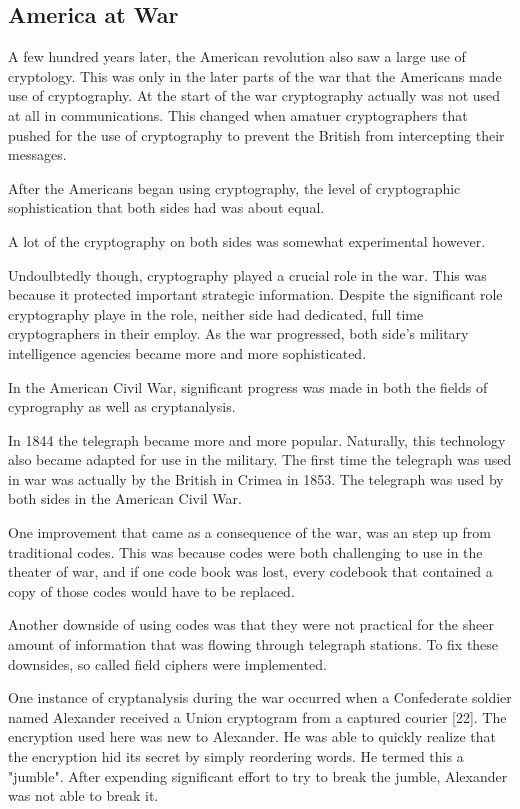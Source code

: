 \documentclass{article}
\begin{document}
    \subsection{America at War} 

    A few hundred years later, the American revolution also saw a large
    use of cryptology. This was only in the later parts of the war
    that the Americans made use of cryptography.
    At the start of the war cryptography actually was not used at all
    in communications. This changed when amatuer cryptographers
    that pushed for the use of cryptography to prevent the British
    from intercepting their messages.

    After the Americans began using cryptography, the level of
    cryptographic sophistication that both sides had was about equal.

    A lot of the cryptography on both sides was somewhat experimental however.

    Undoulbtedly though, cryptography played a crucial role in the war.
    This was because it protected important strategic information.
    Despite the significant role cryptography playe in the role,
    neither side had dedicated, full time cryptographers in their employ.
    As the war progressed, both side's military intelligence agencies
    became more and more sophisticated.

    In the American Civil War, significant progress was made in
    both the fields of cyprography as well as cryptanalysis.

    In 1844 the telegraph became more and more popular. Naturally,
    this technology also became adapted for use in the military.
    The first time the telegraph was used in war was actually by
    the British in Crimea in 1853.
    The telegraph was used by both sides in the American Civil War.

    One improvement that came as a consequence of the war,
    was an step up from traditional codes. This was because
    codes were both challenging to use in the theater of war,
    and if one code book was lost, every codebook that contained
    a copy of those codes would have to be replaced.

    Another downside of using codes was that they were not practical for
    the sheer amount of information that was flowing through telegraph
    stations.
    To fix these downsides, so called field ciphers were implemented.

    One instance of cryptanalysis during the war occurred when a
    Confederate soldier named Alexander received a Union cryptogram
    from a captured courier [22].
    The encryption used here was new to Alexander. He was able
    to quickly realize that the encryption hid its secret by simply
    reordering words. He termed this a "jumble". After expending significant
    effort to try to break the jumble, Alexander was not able to break it.
\end{document}

